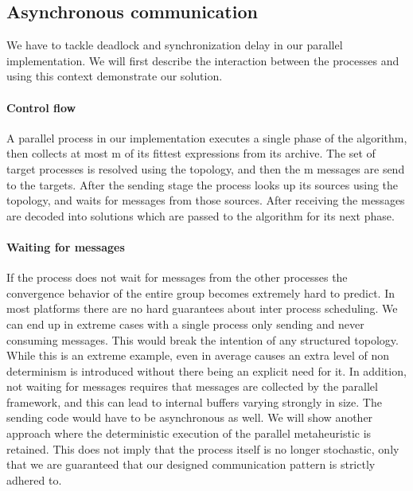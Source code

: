 \subsection{Asynchronous communication}\label{subasync}
We have to tackle deadlock and synchronization delay in our parallel implementation. We will first describe the interaction between the processes and using this context demonstrate our solution.
\paragraph{Control flow}
A parallel process in our implementation executes a single phase of the algorithm, then collects at most m of its fittest expressions from its archive.
The set of target processes is resolved using the topology, and then the m messages are send to the targets. 
After the sending stage the process looks up its sources using the topology, and waits for messages from those sources. 
After receiving the messages are decoded into solutions which are passed to the algorithm for its next phase.
\paragraph{Waiting for messages}
If the process does not wait for messages from the other processes the convergence behavior of the entire group becomes extremely hard to predict. In most platforms there are no hard guarantees about inter process scheduling. We can end up in extreme cases with a single process only sending and never consuming messages. This would break the intention of any structured topology. While this is an extreme example, even in average causes an extra level of non determinism is introduced without there being an explicit need for it. In addition, not waiting for messages requires that messages are collected by the parallel framework, and this can lead to internal buffers varying strongly in size. The sending code would have to be asynchronous as well. We will show another approach where the deterministic execution of the parallel metaheuristic is retained. This does not imply that the process itself is no longer stochastic, only that we are guaranteed that our designed communication pattern is strictly adhered to.
